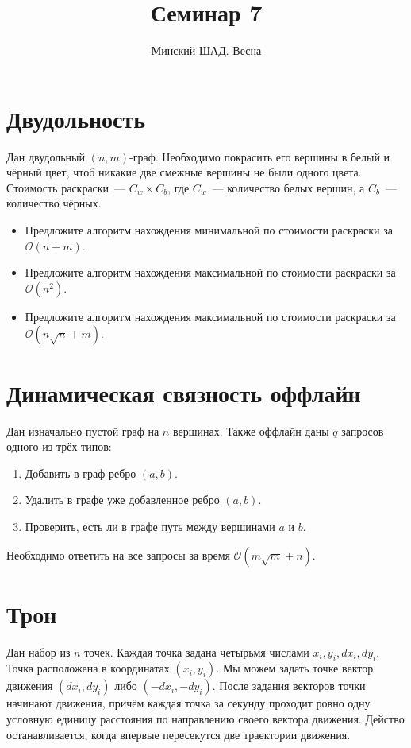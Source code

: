 \documentclass[addpoints]{exam}
\title{Семинар 7}
\author{Минский ШАД. Весна}
\begin{document}
\maketitle

\section{Двудольность}

Дан двудольный $(n,m)$-граф. Необходимо покрасить его вершины в белый и чёрный цвет, чтоб никакие две смежные вершины не были одного цвета. Стоимость раскраски~--- $C_w \times C_b$, где $C_w$~--- количество белых вершин, а $C_b$~--- количество чёрных.

\begin{itemize}
\item Предложите алгоритм нахождения минимальной по стоимости раскраски за $\mathcal{O}(n + m)$.
\item Предложите алгоритм нахождения максимальной по стоимости раскраски за $\mathcal{O}(n^2)$.
\item Предложите алгоритм нахождения максимальной по стоимости раскраски за $\mathcal{O}(n \sqrt{n} + m)$.

\end{itemize}

\section{Динамическая связность оффлайн}

Дан изначально пустой граф на $n$ вершинах. Также оффлайн даны $q$ запросов одного из трёх типов:

\begin{enumerate}
\item Добавить в граф ребро $(a,b)$.
\item Удалить в графе уже добавленное ребро $(a,b)$.
\item Проверить, есть ли в графе путь между вершинами $a$ и $b$.
\end{enumerate}

Необходимо ответить на все запросы за время $\mathcal{O}(m \sqrt{m} + n)$.

\section{Трон}

Дан набор из $n$ точек. Каждая точка задана четырьмя числами $x_i, y_i, dx_i, dy_i$. Точка расположена в координатах $(x_i,y_i)$. Мы можем задать точке вектор движения $(dx_i, dy_i)$ либо $(-dx_i, -dy_i)$. После задания векторов точки начинают движения, причём каждая точка за секунду проходит ровно одну условную единицу расстояния по направлению своего вектора движения. Действо останавливается, когда впервые пересекутся две траектории движения.
\end{document}
